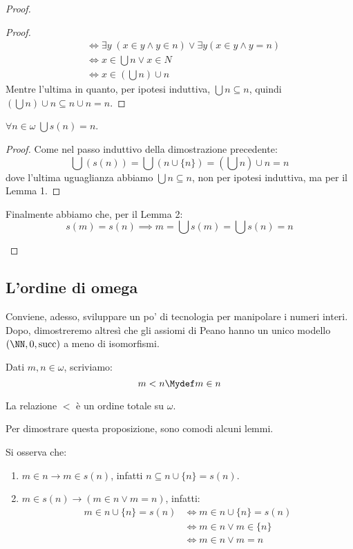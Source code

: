 \documentclass[11pt]{scrartcl}
\begin{document}
\begin{proof}
\begin{enumerate}
\begin{proof}
\[\begin{split}
														& \iff \exists y \; ( x \in y \land y \in n) \lor \exists y(x \in y \land y = n)\\
														& \iff x \in \bigcup n \lor x \in N\\
														& \iff x \in \left(\bigcup n\right) \cup n
						\end{split}
							\]
						Mentre l'ultima in quanto, per ipotesi induttiva, $\bigcup n \subseteq n$, quindi $\left(\bigcup n\right) \cup n \subseteq n \cup n = n$.
					\end{proof}
					\begin{lemma}
						[Lemma 2]
						$\forall n \in \omega \; \bigcup s(n) = n$.
					\end{lemma}
					\begin{proof}
						Come nel passo induttivo della dimostrazione precedente:
						\[ \bigcup\left(s(n)\right) = \bigcup (n \cup \{n\}) = \left(\bigcup n\right) \cup n = n
							\]
						dove l'ultima uguaglianza abbiamo $\bigcup n \subseteq n$, non per ipotesi induttiva, ma per il Lemma 1.
					\end{proof}
					Finalmente abbiamo che, per il Lemma 2:
					\[ s(m) = s(n) \implies m = \bigcup s(m) = \bigcup s(n) = n
						\]
	\end{enumerate}
\end{proof}

\subsection{L'ordine di omega}
Conviene, adesso, sviluppare un po' di tecnologia per manipolare i numeri interi. Dopo, dimostreremo altresì che gli assiomi di Peano hanno un unico modello $(\NN, 0, \text{succ})$
a meno di isomorfismi.

\begin{notation}
	Dati $m,n \in \omega$, scriviamo:
	\[ m < n \Mydef m \in n
		\]
\end{notation}

\begin{proposition}
	La relazione $<$ è un ordine totale su $\omega$. 
\end{proposition}

Per dimostrare questa proposizione, sono comodi alcuni lemmi.

\begin{remark}
	Si osserva che:
	\begin{enumerate}[1.]
		\item $m \in n \rightarrow m \in s(n)$, infatti $n \subseteq n \cup \{n\} = s(n)$.
		\item $m \in s(n) \rightarrow (m \in n \lor m = n)$, infatti:
		 \[ \begin{split}
			m \in n \cup \{n\} = s(n) & \iff m \in n \cup \{n\} = s(n)\\
									& \iff m \in n \lor m \in \{n\}\\
									&\iff m \in n \lor m = n
		 \end{split}
			\]
	\end{enumerate}
\end{remark}
\end{document}
